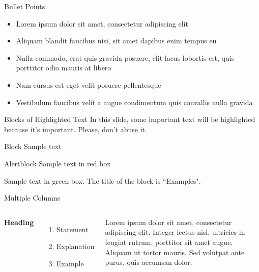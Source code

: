 \documentclass[aspectratio=169,xcolor=dvipsnames]{beamer}
\begin{document}
\begin{frame}{Bullet Points}
    \begin{itemize}
        \item Lorem ipsum dolor sit amet, consectetur adipiscing elit
        \item Aliquam blandit faucibus nisi, sit amet dapibus enim tempus eu
        \item Nulla commodo, erat quis gravida posuere, elit lacus lobortis est, quis porttitor odio mauris at libero
        \item Nam cursus est eget velit posuere pellentesque
        \item Vestibulum faucibus velit a augue condimentum quis convallis nulla gravida
    \end{itemize}
\end{frame}


\begin{frame}{Blocks of Highlighted Text}
    In this slide, some important text will be \alert{highlighted} because it's important. Please, don't abuse it.

    \begin{block}{Block}
        Sample text
    \end{block}

    \begin{alertblock}{Alertblock}
        Sample text in red box
    \end{alertblock}

    \begin{examples}
        Sample text in green box. The title of the block is ``Examples".
    \end{examples}
\end{frame}


\begin{frame}{Multiple Columns}
    \begin{columns}[c] %

        \textbf{Heading}
        \begin{enumerate}
            \item Statement
            \item Explanation
            \item Example
        \end{enumerate}

        Lorem ipsum dolor sit amet, consectetur adipiscing elit. Integer lectus nisl, ultricies in feugiat rutrum, porttitor sit amet augue. Aliquam ut tortor mauris. Sed volutpat ante purus, quis accumsan dolor.

    \end{columns}
\end{frame}
\end{document}
